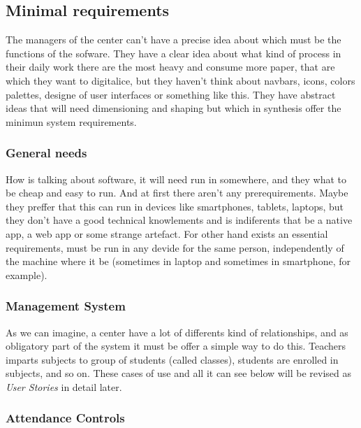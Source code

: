 



\subsection{Minimal requirements}

The managers of the center can't have a precise idea about which must be the functions of the sofware. They have a clear idea about what kind of process in their daily work there are the most heavy and consume more paper, that are which they want to digitalice, but they haven't think about navbars, icons, colors palettes, designe of user interfaces or something like this.  They have abstract ideas that will need dimensioning and shaping but which in synthesis offer the minimun system requirements.

\bigskip
\subsubsection{General needs}
\bigskip

How is talking about software, it will need run in somewhere, and they what to be cheap and easy to run. And at first there aren't any prerequirements. Maybe they preffer that this can run in devices like smartphones, tablets, laptops, but they don't have a good technical knowlements and is indiferents that be a native app, a web app or some strange artefact.
For other hand exists an essential requirements, must be run in any devide for the same person, independently of the machine where it be (sometimes in laptop and sometimes in smartphone, for example).

\bigskip
\subsubsection{Management System}
\bigskip

As we can imagine, a center have a lot of differents kind of relationships, and as obligatory part of the system it must be offer a simple way to do this. Teachers imparts subjects to group of students (called classes), students are enrolled in subjects, and so on. These cases of use and all it can see below will be revised as \textit{User Stories} in detail later.

\bigskip
\subsubsection{Attendance Controls}
\bigskip

